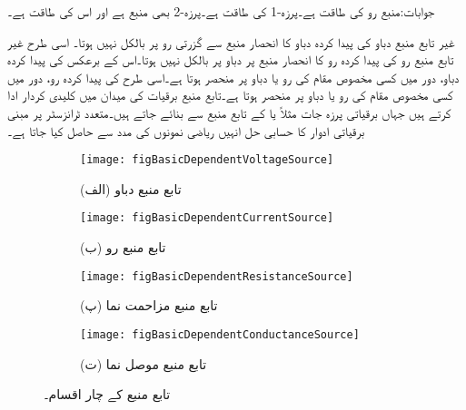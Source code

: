 جوابات:منبع رو کی طاقت  ہے۔پرزہ-1 کی طاقت  ہے۔پرزہ-2 بھی منبع ہے اور اس کی طاقت  ہے۔

غیر تابع منبع دباو کی پیدا کردہ دباو کا انحصار منبع سے گزرتی رو پر بالکل نہیں ہوتا۔ اسی طرح غیر تابع منبع رو کی پیدا کردہ رو کا انحصار منبع پر دباو پر بالکل نہیں ہوتا۔اس کے برعکس  کی پیدا کردہ دباو،  دور میں کسی مخصوص مقام کی رو یا دباو پر منحصر ہوتا ہے۔اسی طرح  کی پیدا کردہ رو،  دور میں کسی مخصوص مقام کی رو یا دباو پر منحصر ہوتا ہے۔تابع منبع برقیات کی میدان میں کلیدی کردار ادا کرتے ہیں جہاں برقیاتی پرزہ جات مثلاً  یا  کے   تابع منبع سے بنائے جاتے ہیں۔متعدد ٹرانزسٹر پر مبنی برقیاتی ادوار کا حسابی حل انہیں ریاضی نمونوں کی مدد سے حاصل کیا جاتا ہے۔

\begin{figure}
\centering
\begin{subfigure}{0.5\textwidth}
\centering
\texttt{[image: figBasicDependentVoltageSource]}
\caption*{(الف) تابع منبع دباو}
\end{subfigure}%
\begin{subfigure}{0.5\textwidth}
\centering
\texttt{[image: figBasicDependentCurrentSource]}
\caption*{(ب) تابع منبع رو}
\end{subfigure}
%
\begin{subfigure}{0.5\textwidth}
\centering
\texttt{[image: figBasicDependentResistanceSource]}
\caption*{(پ) تابع منبع مزاحمت نما}
\end{subfigure}%
\begin{subfigure}{0.5\textwidth}
\centering
\texttt{[image: figBasicDependentConductanceSource]}
\caption*{(ت) تابع منبع موصل نما}
\end{subfigure}%
\caption{تابع منبع کے چار اقسام۔}
\label{شکل_بنیادی_تابع_منبع_اقسام}
\end{figure}

